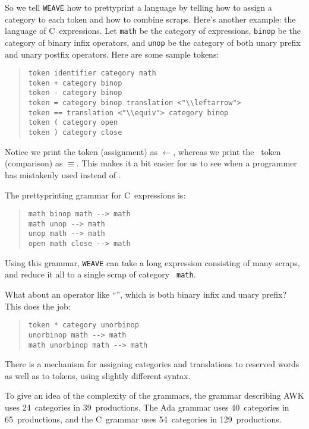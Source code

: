 So we tell {\tt WEAVE} how to prettyprint a language by telling
how to assign a category to each token and how to combine scraps.
Here's another example: the language of C~expressions.
 Let {\tt math} be the category of expressions,
{\tt binop} be the category of binary infix operators, and
{\tt unop} be the category of both unary prefix and unary postfix
operators.
Here are some sample tokens:
\begin{quote}
\begin{verbatim} 
token identifier category math
token + category binop
token - category binop
token = category binop translation <"\\leftarrow">
token == translation <"\\equiv"> category binop
token ( category open
token ) category close
\end{verbatim}
\end{quote}
Notice we print the \token{=} token (assignment) as $\leftarrow$,
whereas we print the \token{==}~token (comparison) as $\equiv$.
This makes it a bit easier for us to see when a programmer has
mistakenly used \token{=} instead of \token{==}.


The prettyprinting grammar for C~expressions is:
\begin{quote}
\begin{verbatim}
math binop math --> math
math unop --> math
unop math --> math
open math close --> math
\end{verbatim}
\end{quote}
Using this grammar, {\tt WEAVE} can take a long expression consisting
of many scraps, and reduce it all to a single scrap of category {\tt
math}. 

What about an operator like ``{\tt *}'', which is both binary infix
and unary prefix? 
This does the job:
\begin{quote}
\begin{verbatim}
token * category unorbinop
unorbinop math --> math
math unorbinop math --> math
\end{verbatim}
\end{quote}


There is a mechanism for assigning categories and translations to
reserved words as well as to tokens, using slightly different syntax. 

To give an idea of the complexity of the grammars, the grammar
describing AWK uses 24~categories in 39~productions.
The Ada grammar uses 40~categories in 65~productions, and the
C~grammar uses 54~categories in 129~productions.

